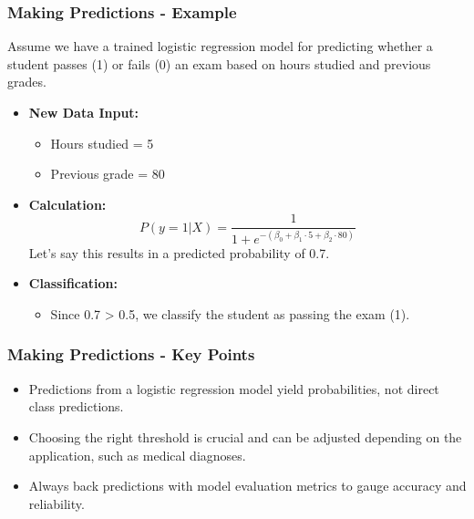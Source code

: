 \documentclass[aspectratio=169]{beamer}
\begin{document}
\begin{frame}[fragile]
  \frametitle{Making Predictions - Example}
  Assume we have a trained logistic regression model for predicting whether a student passes (1) or fails (0) an exam based on hours studied and previous grades.

  \begin{itemize}
    \item \textbf{New Data Input:}
      \begin{itemize}
        \item Hours studied = 5
        \item Previous grade = 80
      \end{itemize}

    \item \textbf{Calculation:}
      \begin{equation}
        P(y=1 | X) = \frac{1}{1 + e^{-(\beta_0 + \beta_1 \cdot 5 + \beta_2 \cdot 80)}}
      \end{equation}
      Let's say this results in a predicted probability of 0.7.

    \item \textbf{Classification:}
      \begin{itemize}
        \item Since 0.7 > 0.5, we classify the student as passing the exam (1).
      \end{itemize}
  \end{itemize}
\end{frame}

\begin{frame}[fragile]
  \frametitle{Making Predictions - Key Points}
  \begin{itemize}
    \item Predictions from a logistic regression model yield probabilities, not direct class predictions.
    \item Choosing the right threshold is crucial and can be adjusted depending on the application, such as medical diagnoses.
    \item Always back predictions with model evaluation metrics to gauge accuracy and reliability.
  \end{itemize}
\end{frame}
\end{document}
